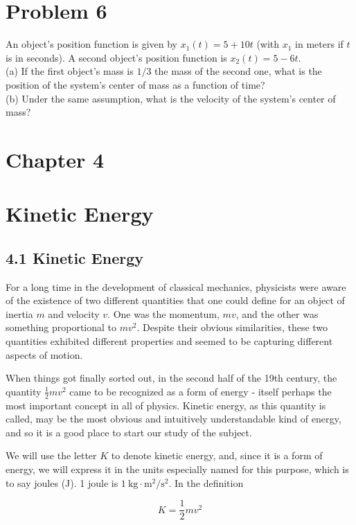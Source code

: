 \documentclass[10pt]{article}
\begin{document}
\section*{Problem 6}
An object's position function is given by $x_{1}(t)=5+10 t$ (with $x_{1}$ in meters if $t$ is in seconds). A second object's position function is $x_{2}(t)=5-6 t$.\\
(a) If the first object's mass is $1 / 3$ the mass of the second one, what is the position of the system's center of mass as a function of time?\\
(b) Under the same assumption, what is the velocity of the system's center of mass?

\section*{Chapter 4}
\section*{Kinetic Energy}
\subsection*{4.1 Kinetic Energy}
For a long time in the development of classical mechanics, physicists were aware of the existence of two different quantities that one could define for an object of inertia $m$ and velocity $v$. One was the momentum, $m v$, and the other was something proportional to $m v^{2}$. Despite their obvious similarities, these two quantities exhibited different properties and seemed to be capturing different aspects of motion.

When things got finally sorted out, in the second half of the 19th century, the quantity $\frac{1}{2} m v^{2}$ came to be recognized as a form of energy - itself perhaps the most important concept in all of physics. Kinetic energy, as this quantity is called, may be the most obvious and intuitively understandable kind of energy, and so it is a good place to start our study of the subject.

We will use the letter $K$ to denote kinetic energy, and, since it is a form of energy, we will express it in the units especially named for this purpose, which is to say joules (J). 1 joule is $1 \mathrm{~kg} \cdot \mathrm{m}^{2} / \mathrm{s}^{2}$. In the definition


\begin{equation*}
K=\frac{1}{2} m v^{2} \tag{4.1}
\end{equation*}
\end{document}
